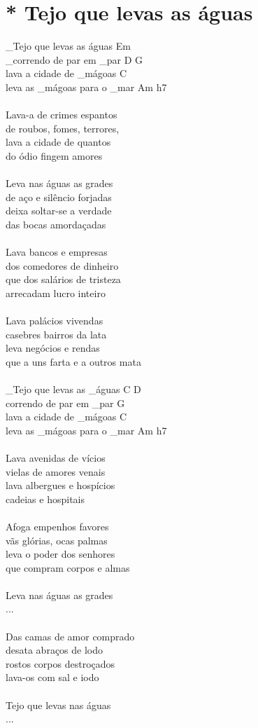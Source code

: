 \documentclass{article}
\begin{document}
\section{ * Tejo que levas as águas}
_Tejo que levas as águas            Em\\
_correndo de par em _par             D G\\
lava a cidade de _mágoas             C\\
leva as _mágoas para o _mar        Am h7\\
\\
Lava-a de crimes espantos\\
de roubos, fomes, terrores,\\
lava a cidade de quantos\\
do ódio fingem amores\\
\\
Leva nas águas as grades\\
de aço e silêncio forjadas\\
deixa soltar-se a verdade\\
das bocas amordaçadas\\
\\
Lava bancos e empresas\\
dos comedores de dinheiro\\
que dos salários de tristeza\\
arrecadam lucro inteiro\\
\\
Lava palácios vivendas\\
casebres bairros da lata\\
leva negócios e rendas \\
que a uns farta e a outros mata\\
\\
_Tejo que levas as _águas             C D\\
correndo de par em _par                 G\\
lava a cidade de _mágoas                C\\
leva as _mágoas para o _mar         Am h7\\
\\
Lava avenidas de vícios\\
vielas de amores venais\\
lava albergues e hospícios\\
cadeias e hospitais\\
\\
Afoga empenhos favores\\
vãs glórias, ocas palmas\\
leva o poder dos senhores\\
que compram corpos e almas\\
\\
Leva nas águas as grades\\
...\\
\\
Das camas de amor comprado\\
desata abraços de lodo\\
rostos corpos destroçados\\
lava-os com sal e iodo\\
\\
Tejo que levas nas águas\\
...\\
\end{document}
